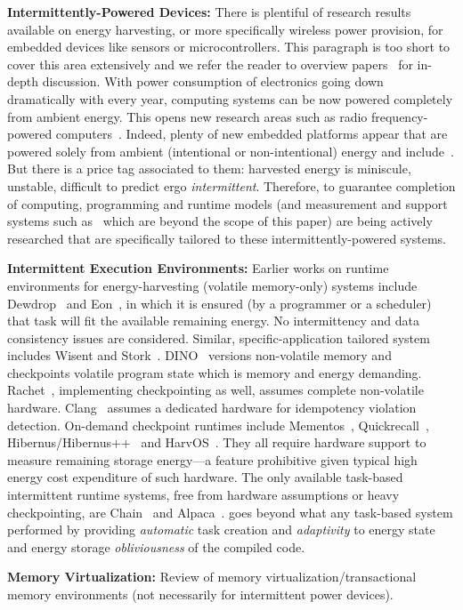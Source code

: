 \noindent \textbf{Intermittently-Powered Devices:} There is plentiful of research results available on energy harvesting, or more specifically wireless power provision, for embedded devices like sensors or microcontrollers. This paragraph is too short to cover this area extensively and we refer the reader to overview papers~\cite{prasad_comst_2014,sample_procieee_2013,huang:commag:2015,visser_procieee_2013,kamalinejad_commag_2015,ku_cst_2016} for in-depth discussion. With power consumption of electronics going down dramatically with every year, computing systems can be now powered completely from ambient energy. This opens new research areas such as radio frequency-powered computers~\cite{patel_pervasive_2017,rf_powered_computing_gollakota_2014}. Indeed, plenty of new embedded platforms appear that are powered solely from ambient (intentional or non-intentional) energy and include~\cite{wisp5,moo,zhao_rfid_2015,holleman_biocas_2008,thomas_jbcs_2012,naderiparizi_rfid_2015,rodriguez_tbcs_2015,liu_sigcomm_2013,kicksat,nadeau_naturebio_2017}. But there is a price tag associated to them: harvested energy is miniscule, unstable, difficult to predict ergo \emph{intermittent}. Therefore, to guarantee completion of computing, programming and runtime models (and measurement and support systems such as~\cite{hester_sensys_2014,hester_sensys_2015,edb} which are beyond the scope of this paper) are being actively researched that are specifically tailored to these intermittently-powered systems. 

\noindent \textbf{Intermittent Execution Environments:} Earlier works on runtime environments for energy-harvesting (volatile memory-only) systems include Dewdrop~\cite{dewdrop} and Eon~\cite{sorber_sensys_2007}, in which it is ensured (by a programmer or a scheduler) that task will fit the available remaining energy. No intermittency and data consistency issues are considered. Similar, specific-application tailored system includes Wisent and Stork~\cite{stork,wisent}. DINO~\cite{dino} versions non-volatile memory and checkpoints volatile program state which is memory and energy demanding. Rachet~\cite{ratchet}, implementing checkpointing as well, assumes complete non-volatile hardware. Clang~\cite{hicks_isca_2017} assumes a dedicated hardware for idempotency violation detection. On-demand checkpoint runtimes include Mementos~\cite{mementos}, Quickrecall~\cite{quickrecall}, Hibernus/Hibernus++~\cite{hibernus,hibernusplusplus} and HarvOS~\cite{mottola2017harvos}. They all require hardware support to measure remaining storage energy---a feature prohibitive given typical high energy cost expenditure of such hardware. The only available task-based intermittent runtime systems, free from hardware assumptions or heavy checkpointing, are Chain~\cite{chain} and Alpaca~\cite{alpaca}. \sys goes beyond what any task-based system performed by providing \emph{automatic} task creation and \emph{adaptivity} to energy state and energy storage \emph{obliviousness} of the compiled code. 

\noindent \textbf{Memory Virtualization:} Review of memory virtualization/transactional memory environments (not necessarily for intermittent power devices). 